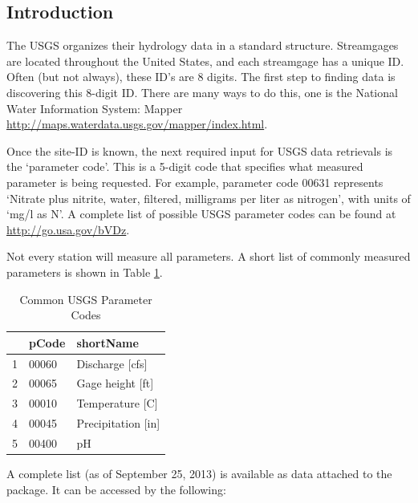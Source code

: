 \documentclass[a4paper,11pt]{article}\usepackage[]{graphicx}\usepackage[]{color}
\begin{document}
\subsection{Introduction}
The USGS organizes their hydrology data in a standard structure.  Streamgages are located throughout the United States, and each streamgage has a unique ID.  Often (but not always), these ID's are 8 digits.  The first step to finding data is discovering this 8-digit ID. There are many ways to do this, one is the National Water Information System: Mapper \url{http://maps.waterdata.usgs.gov/mapper/index.html}.

Once the site-ID is known, the next required input for USGS data retrievals is the `parameter code'.  This is a 5-digit code that specifies what measured parameter is being requested.  For example, parameter code 00631 represents `Nitrate plus nitrite, water, filtered, milligrams per liter as nitrogen', with units of `mg/l as N'. A complete list of possible USGS parameter codes can be found at \url{http://go.usa.gov/bVDz}.

Not every station will measure all parameters. A short list of commonly measured parameters is shown in Table \ref{tab:params}.


\begin{table}[ht]
\centering
\begin{tabular}{rll}
  \hline
 & pCode & shortName \\ 
  \hline
1 & 00060 & Discharge [cfs] \\ 
  2 & 00065 & Gage height [ft] \\ 
  3 & 00010 & Temperature [C] \\ 
  4 & 00045 & Precipitation [in] \\ 
  5 & 00400 & pH \\ 
   \hline
\end{tabular}
\caption{Common USGS Parameter Codes} 
\label{tab:params}
\end{table}



A complete list (as of September 25, 2013) is available as data attached to the package. It can be accessed by the following:
\end{document}
